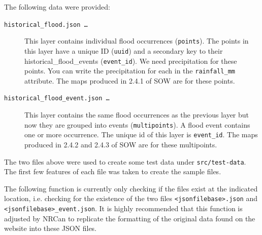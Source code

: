 \documentclass[10pt,a4paper,titlepage,parskip]{scrartcl}
\begin{document}
The following data were provided:
\begin{description}
	\item[\texttt{historical\_flood.json \ldots}] This layer contains individual flood
	occurrences (\texttt{points}). The points in this layer have a unique ID
	(\texttt{uuid}) and a secondary key to their historical\_flood\_events
	(\texttt{event\_id}). We need precipitation for these points. You can
	write the precipitation for each in the \texttt{rainfall\_mm}
	attribute. The maps produced in 2.4.1 of SOW are for these points.
	\item[\texttt{historical\_flood\_event.json \ldots}] This layer contains the same
	flood occurrences as the previous layer but now they are grouped
	into events (\texttt{multipoints}). A flood event contains one or more
	occurrence. The unique id of this layer is \texttt{event\_id}. The maps
	produced in 2.4.2 and 2.4.3 of SOW are for these multipoints.
\end{description}

The two files above were used to create some test data under \texttt{src/test-data}. The first few features of each file was taken to create the sample files.

The following function is currently only checking if the files exist at the indicated location, i.e. checking for the existence of the two files \texttt{\textless{}jsonfilebase\textgreater{}.json} and \texttt{\textless{}jsonfilebase\textgreater{}\_event.json}. It is highly recommended that this function is adjusted by NRCan to replicate the formatting of the original data found on the website into these JSON files.
\end{document}
